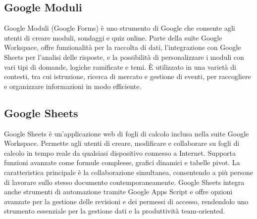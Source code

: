 \vspace{2em}
\subsection*{Google Moduli}
\par Google Moduli (Google Forms) è uno strumento di Google che consente agli utenti di creare moduli, sondaggi e quiz online. Parte della suite Google Workspace, offre funzionalità per la raccolta di dati, l'integrazione con Google Sheets per l'analisi delle risposte, e la possibilità di personalizzare i moduli con vari tipi di domande, logiche ramificate e temi. È utilizzato in una varietà di contesti, tra cui istruzione, ricerca di mercato e gestione di eventi, per raccogliere e organizzare informazioni in modo efficiente.

\vspace{2em}
\subsection*{Google Sheets}
\par Google Sheets è un'applicazione web di fogli di calcolo inclusa nella suite Google Workspace. Permette agli utenti di creare, modificare e collaborare su fogli di calcolo in tempo reale da qualsiasi dispositivo connesso a Internet. Supporta funzioni avanzate come formule complesse, grafici dinamici e tabelle pivot. La caratteristica principale è la collaborazione simultanea, consentendo a più persone di lavorare sullo stesso documento contemporaneamente. Google Sheets integra anche strumenti di automazione tramite Google Apps Script e offre opzioni avanzate per la gestione delle revisioni e dei permessi di accesso, rendendolo uno strumento essenziale per la gestione dati e la produttività team-oriented.
